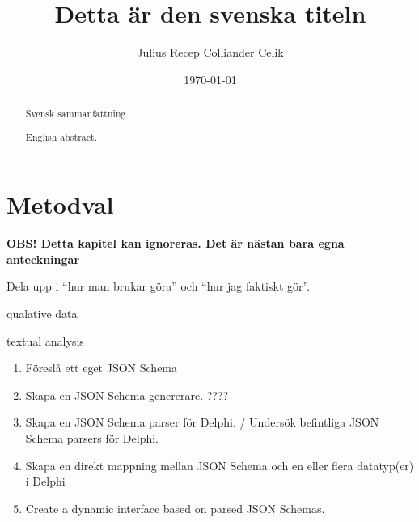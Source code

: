 \documentclass[swedish]{kththesis}
\begin{document}
\title{Detta är den svenska titeln}
\author{Julius Recep Colliander Celik}
\date{\today}

\frontmatter

\titlepage

\begin{abstract}
  Svensk sammanfattning.

\end{abstract}


\begin{otherlanguage}{english}
  \begin{abstract}
    English abstract.

  \end{abstract}
\end{otherlanguage}


\tableofcontents


\mainmatter




\chapter{Metodval}

\textbf{OBS! Detta kapitel kan ignoreras. Det är nästan bara egna anteckningar}

Dela upp i \enquote{hur man brukar göra} och \enquote{hur jag faktiskt gör}.

qualative data

textual analysis

\begin{enumerate}
	\item Föreslå ett eget JSON Schema
	\item Skapa en JSON Schema genererare. ????
	\item Skapa en JSON Schema parser för Delphi. / Undersök befintliga JSON Schema parsers för Delphi.
	\item Skapa en direkt mappning mellan JSON Schema och en eller flera datatyp(er) i Delphi
	\item Create a dynamic interface based on parsed JSON Schemas.
\end{enumerate}
\end{document}
